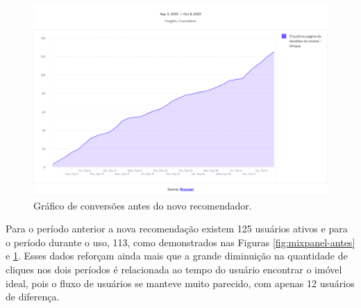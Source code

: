 \begin{figure}[H]
    \centering
    \includegraphics[scale=0.38]{figuras/desenvolvimento/mixpanel-depois.png}
    \caption[Gráfico de conversões antes do novo recomendador]{Gráfico de conversões antes do novo recomendador.}
    \label{fig:mixpanel-depois}
\end{figure}

Para o período anterior a nova recomendação existem 125 usuários ativos e para o período durante o uso, 113, como demonstrados nas Figuras \ref{fig:mixpanel-antes} e \ref{fig:mixpanel-depois}. Esses dados reforçam ainda mais que a grande diminuição na quantidade de cliques nos dois períodos é relacionada ao tempo do usuário encontrar o imóvel ideal, pois o fluxo de usuários se manteve muito parecido, com apenas 12 usuários de diferença.














